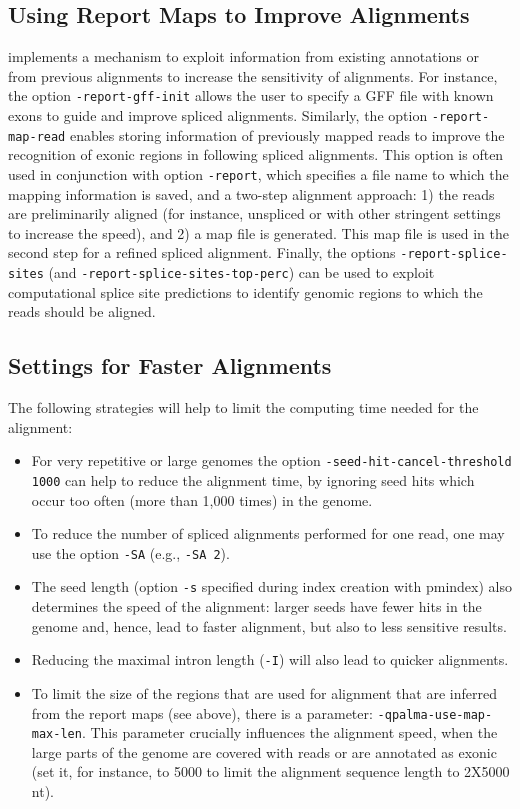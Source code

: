 \documentclass{article}
\begin{document}
\subsection{Using Report Maps to Improve Alignments}
\PALMapper{} implements a mechanism to exploit information from
existing annotations or from previous alignments to increase the
sensitivity of alignments. For instance, the option \texttt{-report-gff-init}
allows the user to specify a GFF file with known exons to guide and
improve spliced alignments. Similarly, the option
\texttt{-report-map-read} enables storing information of previously
mapped reads to improve the recognition of exonic regions in following 
spliced alignments. This option is often used in conjunction with
option \texttt{-report}, which specifies a file name to which the
mapping information is saved, and a two-step alignment approach: 1)
the reads are preliminarily aligned (for instance, unspliced or with
other stringent settings to increase the speed), and 2) a map file is
generated. This map file is used in the second step for a refined
spliced alignment. Finally, the options \texttt{-report-splice-sites} (and
\texttt{-report-splice-sites-top-perc}) can be used to exploit
computational splice site predictions to identify genomic regions to
which the reads should be aligned.  

\subsection{Settings for Faster Alignments} 
The following strategies will help to limit the computing time needed
for the alignment: 
\begin{itemize}
\item For very repetitive or large genomes the option
  \texttt{-seed-hit-cancel-threshold 1000} can help to reduce the
  alignment time, by ignoring seed hits which occur too often (more
  than 1,000 times) in the genome.
\item To reduce the number of spliced alignments performed
for one read, one may use the option \texttt{-SA} (e.g., \texttt{-SA 2}).
\item The seed length (option \texttt{-s} specified during index
  creation with pmindex) also determines the speed of the alignment:
  larger seeds have fewer hits in the genome and, hence, lead to
  faster alignment, but also to less sensitive results.
\item Reducing the maximal intron length (\texttt{-I}) will
also lead to quicker alignments.
\item To limit the size of the regions that are used for alignment
  that are inferred from the report maps (see above), there is a
  parameter: \texttt{-qpalma-use-map-max-len}. This parameter
  crucially influences the alignment speed, when the large parts of
  the genome are covered with reads or are annotated as exonic (set
  it, for instance, to 5000 to limit the alignment sequence length to
  2X5000 nt).  
\end{itemize}
\end{document}
